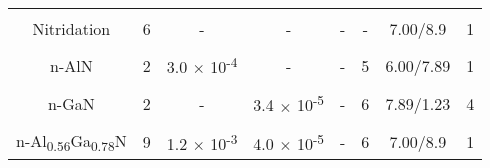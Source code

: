 \begin{table}[!htp]
{\begin{minipage}{17cm}
{\begin{tabular}{cccccccc}
\cellcolor{Gray} & \cellcolor{Gray} & \cellcolor{Gray} & \cellcolor{Gray} & \cellcolor{Gray} & \cellcolor{Gray} & \cellcolor{Gray} & \cellcolor{Gray} \\
\multirow{-2}{*}{\cellcolor{Gray} Nitridation} & \multirow{-2}{*}{\cellcolor{Gray} 6} & \multirow{-2}{*}{\cellcolor{Gray} -} & \multirow{-2}{*}{\cellcolor{Gray} -} & \multirow{-2}{*}{\cellcolor{Gray} -} & \multirow{-2}{*}{\cellcolor{Gray} -} & \multirow{-2}{*}{\cellcolor{Gray} 7.00/8.9} & \multirow{-2}{*}{\cellcolor{Gray} 1} \\

\cellcolor{White} & \cellcolor{White} & \cellcolor{White} & \cellcolor{White} & \cellcolor{White} & \cellcolor{White} & \cellcolor{White} & \cellcolor{White} \\
\multirow{-2}{*}{\cellcolor{White} n-AlN} & \multirow{-2}{*}{\cellcolor{White} 2} & \multirow{-2}{*}{\cellcolor{White} 3.0 $\times$ 10\textsuperscript{-4}} & \multirow{-2}{*}{\cellcolor{White} -} & \multirow{-2}{*}{\cellcolor{White} -} & \multirow{-2}{*}{\cellcolor{White} 5} & \multirow{-2}{*}{\cellcolor{White} 6.00/7.89} & \multirow{-2}{*}{\cellcolor{White} 1} \\

\cellcolor{Gray} & \cellcolor{Gray} & \cellcolor{Gray} & \cellcolor{Gray} & \cellcolor{Gray} & \cellcolor{Gray} & \cellcolor{Gray} & \cellcolor{Gray} \\
\multirow{-2}{*}{\cellcolor{Gray} n-GaN} & \multirow{-2}{*}{\cellcolor{Gray} 2} & \multirow{-2}{*}{\cellcolor{Gray} -} & \multirow{-2}{*}{\cellcolor{Gray} 3.4 $\times$ 10\textsuperscript{-5}} & \multirow{-2}{*}{\cellcolor{Gray} -} & \multirow{-2}{*}{\cellcolor{Gray} 6} & \multirow{-2}{*}{\cellcolor{Gray} 7.89/1.23} & \multirow{-2}{*}{\cellcolor{Gray} 4} \\

\cellcolor{White} & \cellcolor{White} & \cellcolor{White} & \cellcolor{White} & \cellcolor{White} & \cellcolor{White} & \cellcolor{White} & \cellcolor{White} \\
\multirow{-2}{*}{\cellcolor{White} n-Al\textsubscript{0.56}Ga\textsubscript{0.78}N} & \multirow{-2}{*}{\cellcolor{White} 9} & \multirow{-2}{*}{\cellcolor{White} 1.2 $\times$ 10\textsuperscript{-3}} & \multirow{-2}{*}{\cellcolor{White} 4.0 $\times$ 10\textsuperscript{-5}} & \multirow{-2}{*}{\cellcolor{White} -} & \multirow{-2}{*}{\cellcolor{White} 6} & \multirow{-2}{*}{\cellcolor{White} 7.00/8.9} & \multirow{-2}{*}{\cellcolor{White} 1} \\


\end{tabular}}
\end{minipage}}
\end{table}
